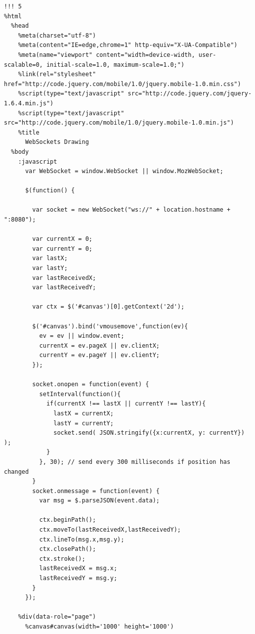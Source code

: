 \begin{verbatim}
!!! 5
%html
  %head
    %meta(charset="utf-8")
    %meta(content="IE=edge,chrome=1" http-equiv="X-UA-Compatible")
    %meta(name="viewport" content="width=device-width, user-scalable=0, initial-scale=1.0, maximum-scale=1.0;")  
    %link(rel="stylesheet" href="http://code.jquery.com/mobile/1.0/jquery.mobile-1.0.min.css")
    %script(type="text/javascript" src="http://code.jquery.com/jquery-1.6.4.min.js")
    %script(type="text/javascript" src="http://code.jquery.com/mobile/1.0/jquery.mobile-1.0.min.js")
    %title
      WebSockets Drawing
  %body
    :javascript
      var WebSocket = window.WebSocket || window.MozWebSocket;

      $(function() {

        var socket = new WebSocket("ws://" + location.hostname + ":8080");
       
        var currentX = 0;
        var currentY = 0;
        var lastX;
        var lastY;
        var lastReceivedX;
        var lastReceivedY;
        
        var ctx = $('#canvas')[0].getContext('2d');

        $('#canvas').bind('vmousemove',function(ev){
          ev = ev || window.event;
          currentX = ev.pageX || ev.clientX;
          currentY = ev.pageY || ev.clientY;
        });
        
        socket.onopen = function(event) {
          setInterval(function(){
            if(currentX !== lastX || currentY !== lastY){
              lastX = currentX;
              lastY = currentY;
              socket.send( JSON.stringify({x:currentX, y: currentY}) );
            }
          }, 30); // send every 300 milliseconds if position has changed
        }
        socket.onmessage = function(event) {
          var msg = $.parseJSON(event.data);
          
          ctx.beginPath();
          ctx.moveTo(lastReceivedX,lastReceivedY);
          ctx.lineTo(msg.x,msg.y);
          ctx.closePath();
          ctx.stroke();
          lastReceivedX = msg.x;
          lastReceivedY = msg.y;
        }
      });

    %div(data-role="page")
      %canvas#canvas(width='1000' height='1000')

\end{verbatim}

